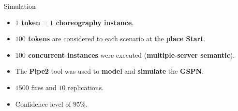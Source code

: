 \documentclass[xcolor=svgnames]{beamer}
\begin{document}
  
  \begin{frame}{ Simulation}
   \begin{itemize}
     \item <1-> \textbf{$1$ token} = \textbf{$1$ choreography instance}.
     \item <2-> \textbf{$100$ tokens} are considered to each scenario at the \textbf{place Start}.
     \item <2-> \textbf{$100$ concurrent instances} were executed (\textbf{multiple-server semantic}).
     \item <3-> The \textbf{Pipe2} tool was used to \textbf{model} and \textbf{simulate} the \textbf{GSPN}.
     \item <4-> $1500$ fires and $10$ replications.
     \item <4-> Confidence level of $95\%$.
   \end{itemize}
  \end{frame}
\end{document}

